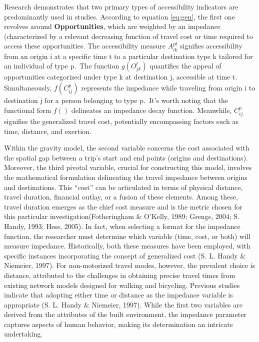 \documentclass[
11pt, %
oneside, %
english, %
singlespacing, %
]{macthesis} %
\begin{document}
Research demonstrates that two primary types of accessibility indicators are predominantly used in studies. According to equation \ref{eq:gen}, the first one revolves around \textbf{Opportunities}, which are weighted by an impedance (characterized by a relevant decreasing function of travel cost or time required to access these opportunities. The accessibility measure \(A^ {pt}_{ik}\) signifies accessibility from an origin i at a specific time t to a particular destination type k tailored for an individual of type p.~The function \(g(O^t_{jk})\) quantifies the appeal of opportunities categorized under type k at destination j, accessible at time t. Simultaneously, \(f(C^p_{ij})\) represents the impedance while traveling from origin i to destination j for a person belonging to type p.~It's worth noting that the functional form \(f()\) delineates an impedance decay function. Meanwhile, \(C^p_{ij}\) signifies the generalized travel cost, potentially encompassing factors such as time, distance, and exertion.

Within the gravity model, the second variable concerns the cost associated with the spatial gap between a trip's start and end points (origins and destinations). Moreover, the third pivotal variable, crucial for constructing this model, involves the mathematical formulation delineating the travel impedance between origins and destinations. This ``cost'' can be articulated in terms of physical distance, travel duration, financial outlay, or a fusion of these elements. Among these, travel duration emerges as the chief cost measure and is the metric chosen for this particular investigation(Fotheringham \& O'Kelly, 1989; Grengs, 2004; S. Handy, 1993; Hess, 2005). In fact, when selecting a format for the impedance function, the researcher must determine which variable (time, cost, or both) will measure impedance. Historically, both these measures have been employed, with specific instances incorporating the concept of generalized cost (S. L. Handy \& Niemeier, 1997). For non-motorized travel modes, however, the prevalent choice is distance, attributed to the challenges in obtaining precise travel times from existing network models designed for walking and bicycling. Previous studies indicate that adopting either time or distance as the impedance variable is appropriate (S. L. Handy \& Niemeier, 1997). While the first two variables are derived from the attributes of the built environment, the impedance parameter captures aspects of human behavior, making its determination an intricate undertaking.
\end{document}
